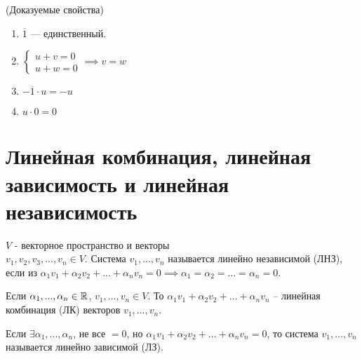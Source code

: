 \begin{property} (Доказуемые свойства)
    \begin{enumerate}
        \item $\overline{1}$ --- единственный.
        \item $\begin{cases}
            u + v = 0 \\
            u + w = 0
        \end{cases} \implies v = w$
        \item  $-\overline{1} \cdot u = -u$
        \item $u \cdot 0 = 0$
    \end{enumerate}
\end{property}

\section{Линейная комбинация, линейная зависимость и  линейная независимость}
\begin{definition}
    $V$ - векторное пространство и векторы \\ $v_1,v_2,v_3,..., v_n \in V$.
    Система $v_1,...,v_n$ называется линейно независимой (ЛНЗ), если из
    $\alpha_1 v_1 + \alpha_2 v_2 + ... + \alpha_n v_n = 0 \implies \alpha_1=\alpha_2=...=\alpha_n =0$.
\end{definition}

\begin{definition}
    Если $\alpha_1,..., \alpha_n \in \mathbb{R}$, $v_1,...,v_n \in V$.
    То $\alpha_1 v_1 + \alpha_2 v_2 + ... + \alpha_n v_n$ -- линейная комбинация (ЛК)
    векторов $v_1,...,v_n$.
\end{definition}

\begin{definition}
    Если $\exists \alpha_1,..., \alpha_n$, не все $=0$, но $\alpha_1 v_1 + \alpha_2 v_2 + ... + \alpha_n v_n = 0$,
    то система $v_1,...,v_n$ называется линейно зависимой (ЛЗ).
\end{definition}

